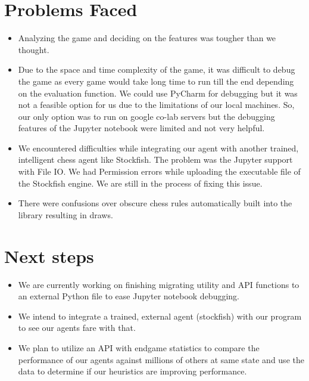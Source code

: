 \documentclass[12pt]{article}
\begin{document}
\section{Problems Faced}
\begin{itemize}
\item Analyzing the game and deciding on the features was tougher than we thought.
\item Due to the space and time complexity of the game, it was difficult to debug the game as every game would take long time to run till the end depending on the evaluation function. We could use PyCharm for debugging but it was not a feasible option for us due to the limitations of our local machines. So, our only option was to run on google co-lab servers but the debugging features of the Jupyter notebook were limited and not very helpful.
\item We encountered difficulties while integrating our agent with another trained, intelligent chess agent like Stockfish. The problem was the Jupyter support with File IO. We had Permission errors while uploading the executable file of the Stockfish engine. We are still in the process of fixing this issue.
\item There were confusions over obscure chess rules automatically built into the library resulting in draws.
\end{itemize}
\section{Next steps}
\begin{itemize}
\item We are currently working on finishing migrating utility and API functions to an external Python file to ease Jupyter notebook debugging.
\item We intend to integrate a trained, external agent (stockfish) with our program to see our agents fare with that.
\item We plan to utilize an API with endgame statistics to compare the performance of our agents against millions of others at same state and use the data to determine if our heuristics are improving performance.

\end{itemize}
\end{document}
